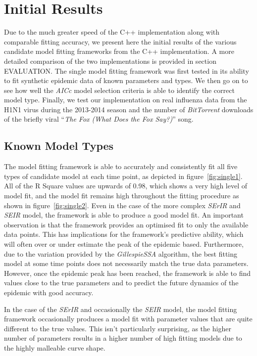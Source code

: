 \section{Initial Results}
Due to the much greater speed of the C++ implementation along with
comparable fitting accuracy, we present here the initial results of
the various candidate model fitting frameworks from the C++
implementation. A more detailed comparison of the two implementations
is provided in section EVALUATION. The single model fitting framework
was first tested in its ability to fit synthetic epidemic data of known
parameters and types. We then go on to see how well the \emph{AICc}
model selection criteria is able to identify the correct model
type. Finally, we test our implementation on real influenza data from
the H1N1 virus during the 2013-2014 season and the number of
\emph{BitTorrent} downloads of the briefly viral ``\emph{The Fox (What Does the
  Fox Say?)}'' song.

\subsection{Known Model Types}
The model fitting framework is able to accurately and consistently fit
all five types of candidate model at each time point, as depicted in figure~\ref{fig:single1}. All of the
R Square values are upwards of 0.98, which shows a very high level of
model fit, and the model fit remains high throughout the fitting
procedure as shown in figure~\ref{fig:single2}. Even in the case of the more complex \emph{SErIR} and
\emph{SEIR} model, the framework is able to produce a good model
fit. An important observation is that the framework provides an
optimised fit to only the available data points. This has implications
for the framework's predictive ability, which will often over or under
estimate the peak of the epidemic based. Furthermore, due to the
variation provided by the \emph{GillespieSSA} algorithm, the best
fitting model at some time points does not necessarily match the
true data parameters. However, once the epidemic peak has been
reached, the framework is able to find values close to the true
parameters and to predict the future dynamics of the epidemic with
good accuracy. 

In the case of the \emph{SErIR} and occasionally the \emph{SEIR} model, the model fitting
framework occasionally produces a model fit with parameter values that
are quite different to the true values. This isn't particularly
surprising, as the higher number of parameters results in a higher
number of high fitting models due to the highly malleable curve shape.

